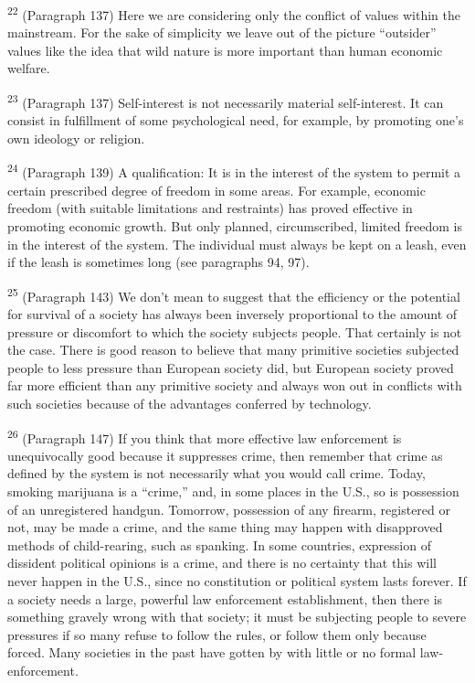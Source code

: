 \documentclass{article}
\begin{document}
\textsuperscript{22} (Paragraph 137) Here we are considering only the conflict of values within the 
mainstream.  For the sake of simplicity we leave out of the picture “outsider” values like the idea 
that wild nature is more important than human economic welfare. \vspace{\baselineskip}

\textsuperscript{23} (Paragraph 137) Self-interest is not necessarily material self-interest.  It can consist in fulfillment 
of some psychological need, for example, by promoting one’s own ideology or religion. \vspace{\baselineskip}

\textsuperscript{24} (Paragraph 139) A qualification: It is in the interest of the system to permit a certain prescribed 
degree of freedom in some areas.  For example, economic freedom (with suitable limitations and 
restraints) has proved effective in promoting economic growth.  But only planned, 
circumscribed, limited freedom is in the interest of the system.  The individual must always be 
kept on a leash, even if the leash is sometimes long (see paragraphs 94, 97). \vspace{\baselineskip}

\textsuperscript{25} (Paragraph 143) We don’t mean to suggest that the efficiency or the potential for survival of a 
society has always been inversely proportional to the amount of pressure or discomfort to which 
the society subjects people.  That certainly is not the case.  There is good  reason to believe that 
many primitive societies subjected people to less pressure than European society did, but European 
society proved far more efficient than any primitive society and always won out in conflicts with 
such societies because of the advantages conferred by technology. \vspace{\baselineskip}

\textsuperscript{26} (Paragraph 147) If you think that more effective law enforcement is unequivocally good 
because it suppresses crime, then remember that crime as defined by the system is not 
necessarily what you would call crime.  Today, smoking marijuana is a “crime,” and, in some 
places in the U.S., so is possession of an unregistered handgun.  Tomorrow, possession of any 
firearm, registered or not, may be made a crime, and the same thing may happen with 
disapproved methods of child-rearing, such as spanking.  In some countries, expression of 
dissident political opinions is a crime, and there is no certainty that this will never happen in the 
U.S., since no constitution or political system lasts forever.  If a society needs a large, powerful 
law enforcement establishment, then there is something gravely wrong with that society; it must 
be subjecting people to severe pressures if so many refuse to follow the rules, or follow them 
only because forced.  Many societies in the past have gotten by with little or no formal law-
enforcement. \vspace{\baselineskip}
\end{document}

